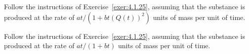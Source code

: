 \documentclass{ximera}
\begin{document}
\begin{problem}\label{exer:4.1.26}  
Follow the instructions of Exercise~\ref{exer:4.1.25}, assuming that
the substance is produced at the rate of   $at/(1+bt(Q(t))^2)$
units of mass per unit of time.
\end{problem}

\begin{problem}\label{exer:4.1.27}  
Follow the instructions of Exercise~\ref{exer:4.1.25}, assuming that
the substance is produced at the rate of   $at/(1+bt)$
units of mass per unit of time.
\end{problem}
\end{document}

